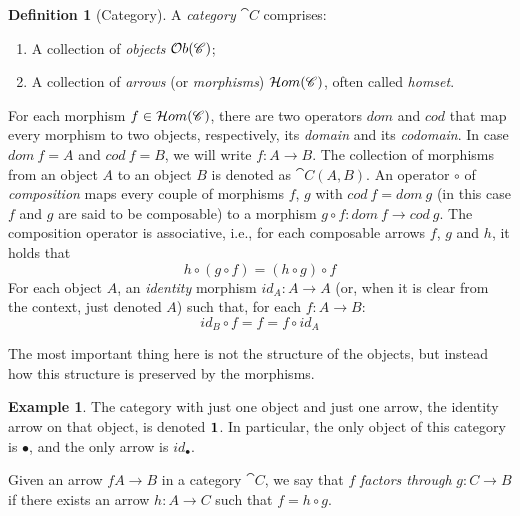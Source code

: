 \documentclass[a4paper, twoside,openright]{report}
\theoremstyle{plain}
\theoremstyle{definition}
\newtheorem{definition}[theorem]{Definition}
\newtheorem{example}[theorem]{Example}
\begin{document}
\begin{definition}[Category]\label{def:category}
    A \emph{category} $\cat{C}$ comprises:
    \begin{enumerate}
        \item A collection of \emph{objects} $\mathcal{O}b(\mathscr{C})$;
        \item A collection of \emph{arrows} (or \emph{morphisms}) $\mathcal{H}om(\mathscr{C})$, often called \emph{homset}.
    \end{enumerate}
    For each morphism $f \in \mathcal{H}om(\mathscr{C})$, there are two operators $dom$ and $cod$ that map every morphism to two objects, respectively, its \emph{domain} and its \emph{codomain}. In case $dom\ f = A$ and $cod\ f = B$, we will write $f: A \rightarrow B$. The collection of morphisms from an object $A$ to an object $B$ is denoted as $\cat{C}(A, B)$.
    An operator $\circ$ of \emph{composition} maps every couple of morphisms $f$, $g$ with $cod\ f = dom \ g$ (in this case $f$ and $g$ are said to be composable) to a morphism $g \circ f : dom\ f \rightarrow cod \ g$. The composition operator is associative, i.e., for each composable arrows $f$, $g$ and $h$, it holds that
    $$
        h \circ (g \circ f) = (h\circ g) \circ f
    $$
    For each object $A$, an \emph{identity} morphism $id_A : A \rightarrow A$ (or, when it is clear from the context, just denoted $A$)  such that, for each $f: A \rightarrow B$:
    \[
        id_B \circ f = f = f \circ id_A 
    \]
\end{definition}

The most important thing here is not the structure of the objects, but instead how this structure is preserved by the morphisms.

\begin{example}\label{ex:1_cat}
    The category with just one object and just one arrow, the identity arrow on that object, is denoted $\textbf 1$. In particular, the only object of this category is $\bullet$, and the only arrow is $id_{\bullet}$.
\end{example}

Given an arrow $f A \rightarrow B$ in a category $\cat C$, we say that $f$ \emph{factors through} $g: C \rightarrow B$ if there exists an arrow $h: A \rightarrow C$ such that $f = h \circ g$.
\end{document}
